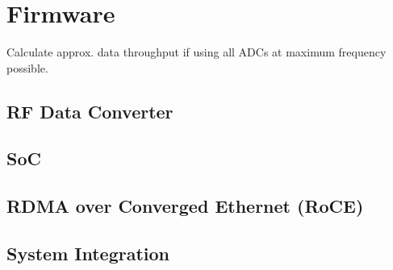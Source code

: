 \section{Firmware}
Calculate approx. data throughput if using all ADCs at maximum frequency possible.
\subsection{RF Data Converter}
\subsection{SoC}
\subsection{RDMA over Converged Ethernet (RoCE)}

\subsection{System Integration}

